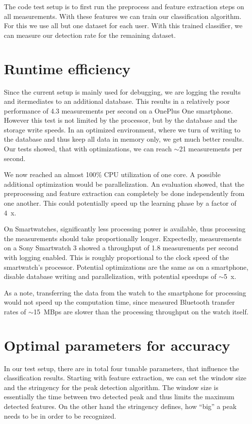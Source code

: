 The code test setup is to first run the preprocess and feature extraction steps on all measurements. With these features we can train our classification algorithm. For this we use all but one dataset for each user. With this trained classifier, we can measure our detection rate for the remaining dataset.

\section{Runtime efficiency}\label{section:runtime}
Since the current setup is mainly used for debugging, we are logging the results and itermediates to an additional database. This results in a relatively poor performance of \num{4.3} measurements per second on a OnePlus One smartphone. However this test is not limited by the processor, but by the database and the storage write speeds. In an optimized environment, where we turn of writing to the database and thus keep all data in memory only, we get much better results. Our tests showed, that with optimizations, we can reach $\sim$\num{21} measurements per second.

We now reached an almost \num{100}$\%$ CPU utilization of one core. A possible additional optimization would be parallelization. An evaluation showed, that the preprocessing and feature extraction can completely be done independently from one another. This could potentially speed up the learning phase by a factor of \SI{4}{x}.

On Smartwatches, significantly less processing power is available, thus processing the measurements should take proportionally longer. Expectedly, measurements on a Sony Smartwatch 3 showed a throughput of \num{1.8} measurements per second with logging enabled. This is roughly proportional to the clock speed of the smartwatch's processor. Potential optimizations are the same as on a smartphone, \ie disable database writing and parallelization, with potential speedups of $\sim$\SI{5}{x}. 

As a note, transferring the data from the watch to the smartphone for processing would not speed up the computation time, since measured Bluetooth transfer rates of $\sim$\SI{15}{MBps} are slower than the processing throughput on the watch itself.

\section{Optimal parameters for accuracy}\label{section:parameters}
In our test setup, there are in total four tunable parameters, that influence the classification results. Starting with feature extraction, we can set the window size and the stringency for the peak detection algorithm. The window size is essentially the time between two detected peak and thus limits the maximum detected features. On the other hand the stringency defines, how ``big'' a peak needs to be in order to be recognized.

